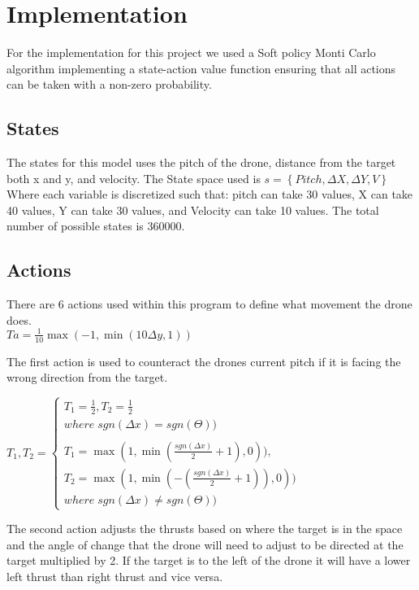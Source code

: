 \section{Implementation}
For the implementation for this project we used a Soft policy Monti Carlo algorithm implementing a state-action value function ensuring that all actions can be taken with a non-zero probability. 

\subsection{States}
The states for this model uses the pitch of the drone, distance from the target both x and y, and velocity.
The State space used is 
$s={\left \{ Pitch, \Delta X, \Delta Y, V \right \}}$
Where each variable is discretized such that: pitch can take 30 values, X can take 40 values, Y can take 30 values, and Velocity can take 10 values. The total number of possible states is 360000.

\subsection{Actions}
There are 6 actions used within this program to define what movement the drone does.
\\
\begingroup\centering
$Ta =  \frac{1}{10}\max (-1,\min (10\Delta y,1))$

\endgroup

The first action is used to counteract the drones current pitch if it is facing the wrong direction from the target. 

\begingroup
$
T_1, T_2 = 
\left\{\begin{matrix}
    T_1 = \frac{1}{2}, T_2 = \frac{1}{2} & \\ where\;sgn(\Delta x) = sgn(\Theta ))

    \\ \\
    T_1 = \max (1,\min (\frac{sgn (\Delta x)}{2}+1),0)), \\
    T_2 = \max (1,\min (-(\frac{sgn (\Delta x)}{2}+1)),0)) \\
    where\;sgn(\Delta x) \neq sgn(\Theta ))
    \end{matrix}\right.$
\break
\endgroup

The second action adjusts the thrusts based on where the target is in the space and the angle of change that the drone will need to adjust to be directed at the target multiplied by 2. If the target is to the left of the drone it will have a lower left thrust than right thrust and vice versa. 


